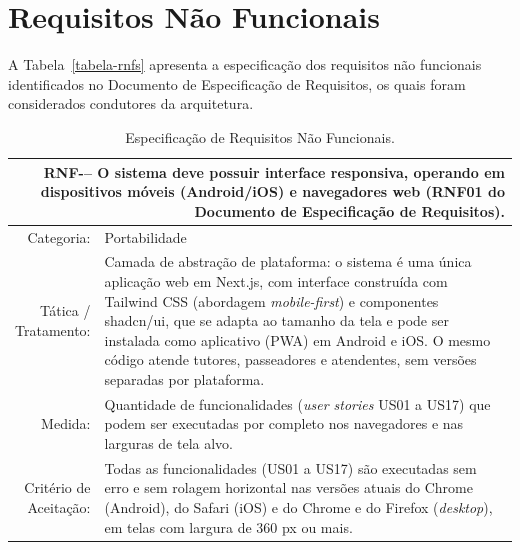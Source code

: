 \chapter{Requisitos Não Funcionais}
\label{sec-rnfs}
\vspace{-1cm}

A Tabela~\ref{tabela-rnfs} apresenta a especificação dos requisitos não funcionais identificados
no Documento de Especificação de Requisitos, os quais foram
considerados condutores da arquitetura.

\renewcommand*\thernfcount{RNF-\arabic{rnfcount}}
\newcommand*\RNF{\refstepcounter{rnfcount}\thernfcount}
\setcounter{rnfcount}{0}

\begin{footnotesize}
\begin{longtable}{|r|p{13cm}|}
	\caption{Especificação de Requisitos Não Funcionais.}
	\label{tabela-rnfs}\\\hline

	\multicolumn{2}{|p{\dimexpr\linewidth-2\tabcolsep-2\arrayrulewidth}|}{\cellcolor{lightgray}\RNF\label{rnf-multiplataforma} -- O sistema deve possuir interface responsiva, operando em dispositivos móveis (Android/iOS) e navegadores web (RNF01 do Documento de Especificação de Requisitos).}\\\hline

	Categoria: & Portabilidade \\\hline

	\parbox[t]{2cm}{\raggedleft Tática /\\Tratamento:} & Camada de abstração de plataforma: o sistema é uma única aplicação web em Next.js, com interface construída com Tailwind CSS (abordagem \textit{mobile-first}) e componentes shadcn/ui, que se adapta ao tamanho da tela e pode ser instalada como aplicativo (PWA) em Android e iOS. O mesmo código atende tutores, passeadores e atendentes, sem versões separadas por plataforma. \\\hline

	Medida: & Quantidade de funcionalidades (\textit{user stories} US01 a US17) que podem ser executadas por completo nos navegadores e nas larguras de tela alvo. \\\hline

	\parbox[t]{2cm}{\raggedleft Critério de\\Aceitação:} & Todas as funcionalidades (US01 a US17) são executadas sem erro e sem rolagem horizontal nas versões atuais do Chrome (Android), do Safari (iOS) e do Chrome e do Firefox (\textit{desktop}), em telas com largura de 360 px ou mais. \\\hline


\end{longtable}
\end{footnotesize}
